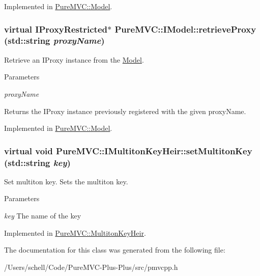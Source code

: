 Implemented in \hyperlink{class_pure_m_v_c_1_1_model_a453947b6a8f925304515ac58078f5e57}{PureMVC::Model}.\hypertarget{class_pure_m_v_c_1_1_i_model_a646757239d2d3e4f711f3738a68bfb06}{
\subsubsection[{retrieveProxy}]{\setlength{\rightskip}{0pt plus 5cm}virtual {\bf IProxyRestricted}$\ast$ PureMVC::IModel::retrieveProxy (std::string {\em proxyName})}}
\label{class_pure_m_v_c_1_1_i_model_a646757239d2d3e4f711f3738a68bfb06}


Retrieve an {\ttfamily IProxy} instance from the \hyperlink{class_pure_m_v_c_1_1_model}{Model}. 
\begin{DoxyParams}{Parameters}
\item[{\em proxyName}]\end{DoxyParams}
\begin{DoxyReturn}{Returns}
the {\ttfamily IProxy} instance previously registered with the given {\ttfamily proxyName}. 
\end{DoxyReturn}


Implemented in \hyperlink{class_pure_m_v_c_1_1_model_acba552053974de59cf6bdac940265634}{PureMVC::Model}.\hypertarget{class_pure_m_v_c_1_1_i_multiton_key_heir_a03acb75ab79defba2c28b8de1bbe1ca6}{
\subsubsection[{setMultitonKey}]{\setlength{\rightskip}{0pt plus 5cm}virtual void PureMVC::IMultitonKeyHeir::setMultitonKey (std::string {\em key})}}
\label{class_pure_m_v_c_1_1_i_multiton_key_heir_a03acb75ab79defba2c28b8de1bbe1ca6}


Set multiton key. Sets the multiton key. 
\begin{DoxyParams}{Parameters}
\item[{\em key}]The name of the key \end{DoxyParams}


Implemented in \hyperlink{class_pure_m_v_c_1_1_multiton_key_heir_abc70ef7c066bc8d7bf0196ec727599bb}{PureMVC::MultitonKeyHeir}.

The documentation for this class was generated from the following file:\begin{DoxyCompactItemize}
\item 
/Users/schell/Code/PureMVC-\/Plus-\/Plus/src/pmvcpp.h\end{DoxyCompactItemize}
